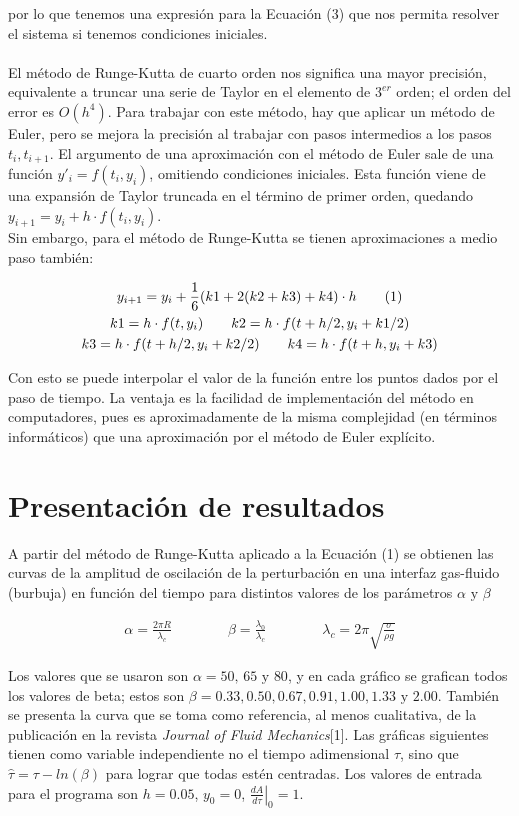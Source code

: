 \documentclass[12pt, notitlepage]{article}
\newcommand\numberthis{\addtocounter{equation}{1}\tag{\theequation}}
\begin{document}
por lo que tenemos una expresión para la Ecuación (3) que nos permita resolver el sistema si tenemos condiciones iniciales.\\\\
El método de Runge-Kutta de cuarto orden nos significa una mayor precisión, equivalente a truncar una serie de Taylor en el elemento de $3^{er}$ orden; el orden del error es $O(h^4)$. Para trabajar con este método, hay que aplicar un método de Euler, pero se mejora la precisión al trabajar con pasos intermedios a los pasos $t_i, t_{i+1}$. El argumento de una aproximación con el método de Euler sale de una función $y'_i = f(t_i,y_i)$, omitiendo condiciones iniciales. Esta función viene de una expansión de Taylor truncada en el término de primer orden, quedando $y_{i+1} = y_i + h\cdot f(t_i, y_i)$.\\
Sin embargo, para el método de Runge-Kutta se tienen aproximaciones a medio paso también:

\begin{gather*}
y_{i+1} = y_i + \frac{1}{6}(k1 + 2(k2 + k3) + k4)\cdot h \numberthis\\
k1 = h\cdot f(t,y_i) \qquad k2 = h\cdot f(t+h/2, y_i + k1/2)\\
k3 = h\cdot f(t + h/2, y_i + k2/2) \qquad k4 = h\cdot f(t + h, y_i + k3)
\end{gather*}

Con esto se puede interpolar el valor de la función entre los puntos dados por el paso de tiempo. La ventaja es la facilidad de implementación del método en computadores, pues es aproximadamente de la misma complejidad (en términos informáticos) que una aproximación por el método de Euler explícito.

\section{Presentación de resultados}
A partir del método de Runge-Kutta aplicado a la Ecuación (1) se obtienen las curvas de la amplitud de oscilación de la perturbación en una interfaz gas-fluido (burbuja) en función del tiempo para distintos valores de los parámetros $\alpha \text{ y } \beta$

\begin{gather*}
\alpha = \frac{2\pi R}{\lambda_c}\qquad\qquad\beta = \frac{\lambda_0}{\lambda_c}\qquad\qquad \lambda_c = 2\pi\sqrt{\frac{\sigma}{\rho g}}
\end{gather*}

Los valores que se usaron son $\alpha = 50\text{, }65 \text{ y } 80$, y en cada gráfico se grafican todos los valores de beta; estos son $\beta = 0.33, 0.50, 0.67, 0.91, 1.00, 1.33 \text{ y } 2.00$. También se presenta la curva que se toma como referencia, al menos cualitativa, de la publicación en la revista \textit{Journal of Fluid Mechanics}[1]. Las gráficas siguientes tienen como variable independiente no el tiempo adimensional $\tau$, sino que $\hat{\tau} = \tau - ln(\beta)$ para lograr que todas estén centradas. Los valores de entrada para el programa son $h = 0.05$, $y_0 = 0$, $\left.\frac{dA}{d\tau}\right|_0 = 1$.
\end{document}
